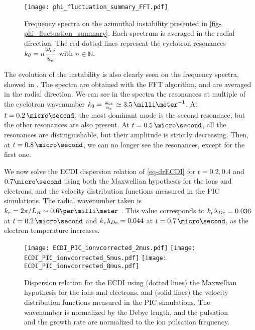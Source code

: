     \begin{figure}[!hbt]
      \centering
      \texttt{[image: phi\_fluctuation\_summary\_FFT.pdf]}
      \caption{Frequency spectra on the azimuthal instability presented in \cref{fig-phi_fluctuation_summary}. Each spectrum is averaged in the radial direction. The red dotted lines represent the cyclotron resonances $k_{\theta} = n \dfrac{\omega_{ce}}{u_e}$ with $n \in \mathbb{N}$.}
      \label{fig-phi_fluctuation_summary_FFT}
    \end{figure}
    
    The evolution of the instability is also clearly seen on the frequency spectra, showed in .
    The spectra are obtained with the FFT algorithm, and are averaged in the radial direction.
    We can see in the spectra the resonances at multiple of the cyclotron wavenumber $k_0 = \frac{\oce}{u_e} \simeq 3.5\,\milli\meter^{-1}$.
    At $t=0.2\,\micro\second$, the most dominant mode is the second resonance, but the other resonances are also present.
    At $t=0.5\,\micro\second$, all the resonances are distinguishable, but their amplitude is strictly decreasing.
    Then, at $t=0.8\,\micro\second$, we can no longer see the resonances, except for the first one.
    
    \vspace{1em}
    We now solve the \ac{ECDI} dispersion relation of \cref{eq-drECDI} for $t=0.2, 0.4$ and $0.7\micro\second$ using both the Maxwellian hypothesis for the ions and electrons, and the velocity distribution functions measured in the \ac{PIC} simulations.
    The radial wavenumber taken is $k_r = 2 \pi/L_R \sim 0.6 \per\milli\meter$ \citep{lafleur2016,janhunen2018}.
    This value corresponds to $k_r \lambda_{De} = 0.036$ at $t=0.2\,\micro\second$ and $k_r \lambda_{De} = 0.044$ at $t=0.7\,\micro\second$, as the electron temperature increases.

    \begin{figure}[!hbt]
      \centering
        \texttt{[image: ECDI\_PIC\_ionvcorrected\_2mus.pdf]} 
        \texttt{[image: ECDI\_PIC\_ionvcorrected\_5mus.pdf]} 
        \texttt{[image: ECDI\_PIC\_ionvcorrected\_8mus.pdf]} 
      \caption{Dispersion relation for the \acs{ECDI} using (dotted lines) the Maxwellian hypothesis for the ions and electrons, and (solid lines) the velocity distribution functions measured in the \acs{PIC} simulations. The wavenumber is normalized by the Debye length, and the pulsation and the growth rate are normalized to the ion pulsation frequency.}
      \label{fig-DRECDI}
    \end{figure}
    
